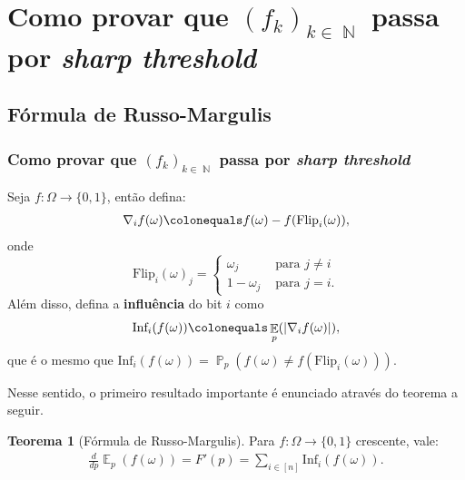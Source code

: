 \documentclass[9pt]{beamer}
\theoremstyle{definition} %
\newtheorem{mythm}{Teorema}
\DeclareMathOperator{\PX}{\mathbb{P}} %
\DeclareMathOperator{\EX}{\mathbb{E}} %
\DeclareMathOperator{\NX}{\mathbb{N}} %
\newcommand{\diff}{{\nabla_i}f(\omega)}
\newcommand{\flip}{\text{Flip}_i(\omega)}
\newcommand{\infl}{\text{Inf}_i(f(\omega))}
\begin{document}
	\section{Como provar que $(f_k)_{k \in \NX}$ passa por \textit{\textbf{sharp threshold}}}
	\subsection{Fórmula de Russo-Margulis}
	\begin{frame}[t]
		\frametitle{Como provar que $(f_k)_{k \in \NX}$ passa por \textit{\textbf{sharp threshold}}}	
		Seja $f: \Omega \to  \{0,1\}$, então defina:
		\begin{align*}
		\diff \colonequals f(\omega) - f(\flip),
		\end{align*}
		onde
		\[ \flip_j = \begin{cases}
		\omega_j   & \text{ para } j \neq i \\
		1 - \omega_j & \text{ para } j = i.
		\end{cases}
		\]
		Além disso, defina a \textbf{influência} do bit $i$ como 
		\begin{align*}
		\infl \colonequals \EX_p(|\diff|),
		\end{align*}
		que é o mesmo que $\infl = \PX_p(f(\omega) \neq f(\flip))$.
		\pause
		
		Nesse sentido, o primeiro resultado importante é enunciado através do teorema a seguir.
		\begin{mythm}[Fórmula de Russo-Margulis] \label{thm:russo-margulis}
			Para $f: \Omega \to \{0,1\}$ crescente, vale:
			\begin{align*}
			\frac{d}{dp}\EX_p(f(\omega)) = F'(p) = \sum_{i \in [n]} \infl.
			\end{align*}
		\end{mythm}
	\end{frame}
\end{document}
